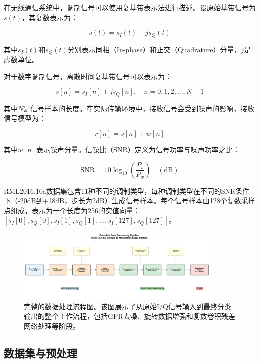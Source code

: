 \documentclass[conference]{IEEEtran}
\begin{document}
在无线通信系统中，调制信号可以使用复基带表示法进行描述。设原始基带信号为$s(t)$，其复数表示为：

\begin{equation}
s(t) = s_I(t) + js_Q(t)
\end{equation}

其中$s_I(t)$和$s_Q(t)$分别表示同相（In-phase）和正交（Quadrature）分量，$j$是虚数单位。

对于数字调制信号，离散时间复基带信号可以表示为：

\begin{equation}
s[n] = s_I[n] + js_Q[n], \quad n = 0, 1, 2, ..., N-1
\end{equation}

其中$N$是信号样本的长度。在实际传输环境中，接收信号会受到噪声的影响，接收信号模型为：

\begin{equation}
r[n] = s[n] + w[n]
\end{equation}

其中$w[n]$表示噪声分量。信噪比（SNR）定义为信号功率与噪声功率之比：

\begin{equation}
\mathrm{SNR} = 10\log_{10}\left(\frac{P_s}{P_w}\right) \quad(\mathrm{dB})
\end{equation}

RML2016.10a数据集包含11种不同的调制类型，每种调制类型在不同的SNR条件下（-20dB到+18dB，步长为2dB）生成信号样本。每个信号样本由128个复数采样点组成，表示为一个长度为256的实值向量：$[s_I[0], s_Q[0], s_I[1], s_Q[1], ..., s_I[127], s_Q[127]]$。

\begin{figure}[htbp]
\centering
\includegraphics[width=0.9\textwidth]{figure/data_processing_pipeline.png}
\caption{完整的数据处理流程图。该图展示了从原始I/Q信号输入到最终分类输出的整个工作流程，包括GPR去噪、旋转数据增强和复数卷积残差网络处理等阶段。}
\label{fig:data_pipeline}
\end{figure}

\subsection{数据集与预处理}
\end{document}
